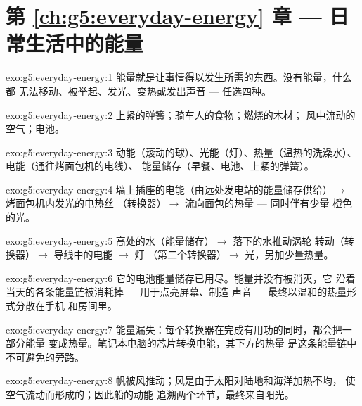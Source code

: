 \section*{第 \ref{ch:g5:everyday-energy} 章 --- 日常生活中的能量}

\begin{solution}{exo:g5:everyday-energy:1}
能量就是让事情得以发生所需的东西。没有能量，什么都
无法移动、被举起、发光、变热或发出声音 --- 任选四种。
\end{solution}

\begin{solution}{exo:g5:everyday-energy:2}
上紧的弹簧；骑车人的食物；燃烧的木材；
风中流动的空气；电池。
\end{solution}

\begin{solution}{exo:g5:everyday-energy:3}
动能（滚动的球）、光能（灯）、热量（温热的洗澡水）、
电能（通往烤面包机的电线）、
能量储存（早餐、电池、上紧的弹簧）。
\end{solution}

\begin{solution}{exo:g5:everyday-energy:4}
墙上插座的电能（由远处发电站的能量储存供给）$\to$
烤面包机内发光的电热丝
（转换器）$\to$ 流向面包的热量 --- 同时伴有少量
橙色的光。
\end{solution}

\begin{solution}{exo:g5:everyday-energy:5}
高处的水（能量储存）$\to$ 落下的水推动涡轮
转动（转换器）$\to$ 导线中的电能 $\to$ 灯
（第二个转换器）$\to$ 光，另加少量热量。
\end{solution}

\begin{solution}{exo:g5:everyday-energy:6}
它的电池能量储存已用尽。能量并没有被消灭，它
沿着当天的各条能量链被消耗掉 --- 用于点亮屏幕、制造
声音 --- 最终以温和的热量形式分散在手机
和房间里。
\end{solution}

\begin{solution}{exo:g5:everyday-energy:7}
能量漏失：每个转换器在完成有用功的同时，都会把一部分能量
变成热量。笔记本电脑的芯片转换电能，其下方的热量
是这条能量链中不可避免的旁路。
\end{solution}

\begin{solution}{exo:g5:everyday-energy:8}
帆被风推动；风是由于太阳对陆地和海洋加热不均，
使空气流动而形成的；因此船的动能
追溯两个环节，最终来自阳光。
\end{solution}

